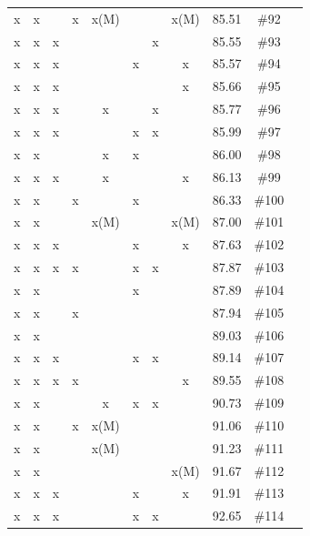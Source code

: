 \begin{table}[H]
{\begin{tabular}{c c c c c c c c c c c}
 x    & x    &      & x    & x(M) &      &      & x(M) & 85.51 & \#92 \\
 x    & x    & x    &      &      &      & x    &      & 85.55 & \#93 \\
 x    & x    & x    &      &      & x    &      & x    & 85.57 & \#94 \\
 x    & x    & x    &      &      &      &      & x    & 85.66 & \#95 \\
 x    & x    & x    &      & x    &      & x    &      & 85.77 & \#96 \\
 x    & x    & x    &      &      & x    & x    &      & 85.99 & \#97 \\
 x    & x    &      &      & x    & x    &      &      & 86.00 & \#98 \\
 x    & x    & x    &      & x    &      &      & x    & 86.13 & \#99 \\
 x    & x    &      & x    &      & x    &      &      & 86.33 & \#100 \\
 x    & x    &      &      & x(M) &      &      & x(M) & 87.00 & \#101 \\
 x    & x    & x    &      &      & x    &      & x    & 87.63 & \#102 \\
 x    & x    & x    & x    &      & x    & x    &      & 87.87 & \#103 \\
 x    & x    &      &      &      & x    &      &      & 87.89 & \#104 \\
 x    & x    &      & x    &      &      &      &      & 87.94 & \#105 \\
 x    & x    &      &      &      &      &      &      & 89.03 & \#106 \\
 x    & x    & x    &      &      & x    & x    &      & 89.14 & \#107 \\
 x    & x    & x    & x    &      &      &      & x    & 89.55 & \#108 \\
 x    & x    &      &      & x    & x    & x    &      & 90.73 & \#109 \\
 x    & x    &      & x    & x(M) &      &      &      & 91.06 & \#110 \\
 x    & x    &      &      & x(M) &      &      &      & 91.23 & \#111 \\
 x    & x    &      &      &      &      &      & x(M) & 91.67 & \#112 \\
 x    & x    & x    &      &      & x    &      & x    & 91.91 & \#113 \\
 x    & x    & x    &      &      & x    & x    &      & 92.65 & \#114 \\

\end{tabular}}
\end{table}
